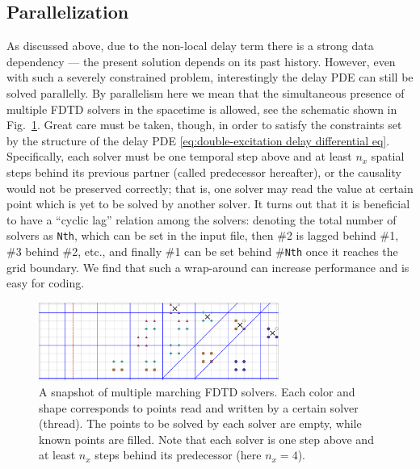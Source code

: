 \documentclass[12pt,letter,onecolumn,notitlepage]{article}
\begin{document}
\subsection{Parallelization}
As discussed above, due to the non-local delay term there is a strong data dependency --- the present solution depends on its past history. However, even with such a severely constrained problem, interestingly the delay PDE can still be solved parallelly. By parallelism here we mean that the simultaneous presence of multiple FDTD solvers in the spacetime is allowed, see the schematic shown in Fig.~\ref{fig: FDTD multithread marching}. Great care must be taken, though, in order to satisfy the constraints set by the structure of the delay PDE \eqref{eq:double-excitation delay differential eq}. Specifically, each solver must be one temporal step above and at least $n_x$ spatial steps behind its previous partner (called predecessor hereafter), or the causality would not be preserved correctly; that is, one solver may read the value at certain point which is yet to be solved by another solver. It turns out that it is beneficial to have a ``cyclic lag'' relation among the solvers: denoting the total number of solvers as \texttt{Nth}, which can be set in the input file, then \#2 is lagged behind \#1, \#3 behind \#2, etc., and finally \#1 can be set behind \#\texttt{Nth} once it reaches the grid boundary. We find that such a wrap-around can increase performance and is easy for coding. 

\begin{figure}[hbtp]
	\centering
	\includegraphics[width=0.7\textwidth, trim=12.8cm 0 0 0, clip]{FDTD_multithread_schematic_2}
	\caption{A snapshot of multiple marching FDTD solvers. Each color and shape corresponds to points read and written by a certain solver (thread). The points to be solved by each solver are empty, while known points are filled. Note that each solver is one step above and at least $n_x$ steps behind its predecessor (here $n_x=4$).}
	\label{fig: FDTD multithread marching}
\end{figure}
\end{document}
